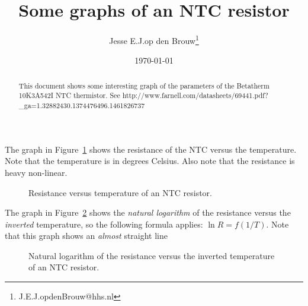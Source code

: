 \documentclass[a4paper]{article}
\author{Jesse E.\@ J.\@ op den Brouw\thanks{\sffamily J.E.J.opdenBrouw@hhs.nl}}
\title{Some graphs of an NTC resistor}
\date{\today}
\begin{document}
\maketitle
\vspace*{2cm}
\begin{abstract}
This document shows some interesting graph of the parameters of the Betatherm 10K3A542I NTC thermistor.
See {\sffamily http://www.farnell.com/datasheets/69441.pdf?\_ga=1.32882430.1374476496.1461826737}
\end{abstract}
\newpage

The graph in Figure~\ref{fig1} shows the resistance of the NTC versus the temperature. Note that the temperature is in degrees Celsius. Also note that the resistance is heavy non-linear.

\begin{figure}[!ht]
\caption{Resistance versus temperature of an NTC resistor.}
\label{fig1}
\end{figure}

The graph in Figure~\ref{fig2} shows the \emph{natural logarithm} of the resistance versus the \emph{inverted} temperature, so the following formula applies: $\ln R = f(1/T)$. Note that this graph shows an \emph{almost} straight line

\begin{figure}[!ht]
\caption{Natural logarithm of the resistance versus the inverted temperature of an NTC resistor.}
\label{fig2}
\end{figure}
\end{document}
